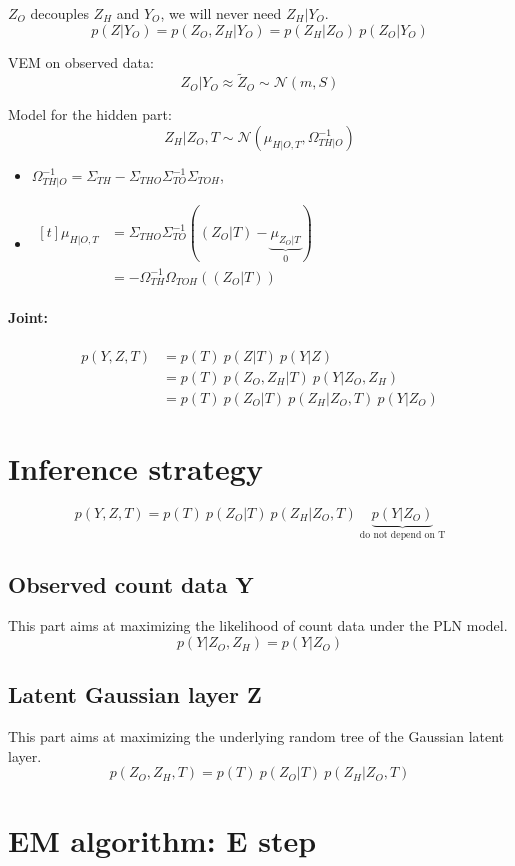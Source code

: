 \documentclass[11pt,a4paper]{article}
\begin{document}
$Z_O$ decouples $Z_H$ and $Y_O$, we will never need $Z_H|Y_O$.
$$ p(Z|Y_O) = p(Z_O,Z_H | Y_O) = p(Z_H|Z_O) \: p(Z_O|Y_O) $$


VEM on observed data: $$Z_O|Y_O \approx \widetilde{Z}_O \sim \mathcal{N}(m,S)$$

Model for the hidden part: $$Z_H|Z_O,T \sim \mathcal{N}(\mu_{H|O,T}, \Omega_{TH|O}^{-1})$$ 

\begin{itemize}
\item $\Omega_{TH|O}^{-1} = \Sigma_{TH} -\Sigma_{THO}\Sigma_{TO}^{-1}\Sigma_{TOH}$, 

\item$ \displaystyle\begin{aligned}[t]
\mu_{H|O,T} &= \Sigma_{THO}\Sigma_{TO}^{-1}((Z_O|T)-\underbrace{\mu_{Z_O|T}}_{0}) \\
 &= -\Omega_{TH}^{-1}\Omega_{TOH}((Z_O|T))
\end{aligned}$

 
\end{itemize}

\paragraph{Joint:}
\begin{align*}
p(Y,Z,T)& = p(T) \: p(Z|T) \: p(Y|Z) \\
&= p(T)\: p(Z_O,Z_H|T) \: p(Y|Z_O,Z_H) \\
&= p(T) \: p(Z_O|T) \: p(Z_H | Z_O,T)  \: p(Y|Z_O)
\end{align*} 

\section{Inference strategy}
$$p(Y,Z,T)= p(T) \: p(Z_O|T) \: p(Z_H | Z_O,T)  \: \underbrace{p(Y|Z_O)}_{\text{do not depend on T}}$$
\subsection{Observed count data Y}
This part aims at maximizing the likelihood of count data under the PLN model. 
$$p(Y|Z_O,Z_H) = p(Y|Z_O)$$
\subsection{Latent Gaussian layer Z}
This part aims at maximizing the underlying random tree of the Gaussian latent layer.
$$p(Z_O,Z_H,T) = p(T) \: p(Z_O|T) \: p(Z_H | Z_O,T)$$
\section{EM algorithm: E step}
\end{document}
